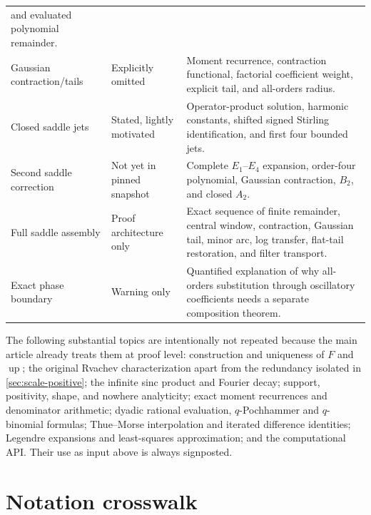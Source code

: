 \documentclass[11pt,oneside]{article}
\theoremstyle{definition}
\theoremstyle{remark}
\newcommand{\Up}{\operatorname{up}}
\begin{document}
\begin{longtable}{@{}p{}p{}p{}@{}}
and evaluated polynomial remainder.\\
Gaussian contraction/tails & Explicitly omitted & Moment recurrence, contraction functional,
factorial coefficient weight, explicit tail, and all-orders radius.\\
Closed saddle jets & Stated, lightly motivated & Operator-product solution, harmonic constants,
shifted signed Stirling identification, and first four bounded jets.\\
Second saddle correction & Not yet in pinned snapshot & Complete $E_1$--$E_4$ expansion,
order-four polynomial, Gaussian contraction, $B_2$, and closed $A_2$.\\
Full saddle assembly & Proof architecture only & Exact sequence of finite remainder, central
window, contraction, Gaussian tail, minor arc, log transfer, flat-tail restoration, and filter
transport.\\
Exact phase boundary & Warning only & Quantified explanation of why all-orders substitution
through oscillatory coefficients needs a separate composition theorem.\\
\bottomrule
\end{longtable}
\endgroup

The following substantial topics are intentionally not repeated because the main article
already treats them at proof level: construction and uniqueness of $F$ and $\Up$; the original
Rvachev characterization apart from the redundancy isolated in \cref{sec:scale-positive}; the infinite sinc product and Fourier decay; support, positivity,
shape, and nowhere analyticity; exact moment recurrences and denominator arithmetic; dyadic
rational evaluation, $q$-Pochhammer and $q$-binomial formulas; Thue--Morse interpolation and
iterated difference identities; Legendre expansions and least-squares approximation; and the
computational API.  Their use as input above is always signposted.

\section{Notation crosswalk}
\label{app:notation}
\end{document}
